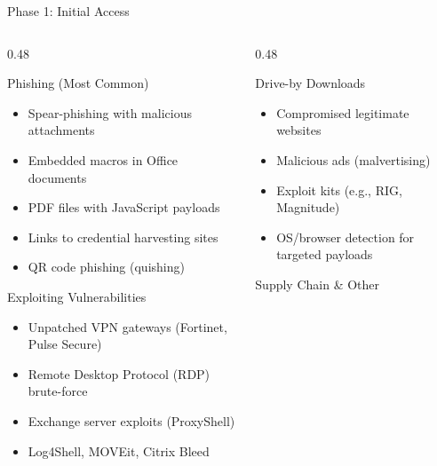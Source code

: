 \documentclass[aspectratio=169]{beamer}
\begin{document}
\begin{frame}{Phase 1: Initial Access}
  \vspace{0.5em}
  \begin{columns}[T]
    \begin{column}{0.48\textwidth}
      \begin{block}{Phishing (Most Common)}
        \footnotesize
        \begin{itemize}
          \item Spear-phishing with malicious attachments
          \item Embedded macros in Office documents
          \item PDF files with JavaScript payloads
          \item Links to credential harvesting sites
          \item QR code phishing (quishing)
        \end{itemize}
      \end{block}
      \vspace{0.3em}
      \begin{block}{Exploiting Vulnerabilities}
        \footnotesize
        \begin{itemize}
          \item Unpatched VPN gateways (Fortinet, Pulse Secure)
          \item Remote Desktop Protocol (RDP) brute-force
          \item Exchange server exploits (ProxyShell)
          \item Log4Shell, MOVEit, Citrix Bleed
        \end{itemize}
      \end{block}
    \end{column}
    \begin{column}{0.48\textwidth}
      \begin{block}{Drive-by Downloads}
        \footnotesize
        \begin{itemize}
          \item Compromised legitimate websites
          \item Malicious ads (malvertising)
          \item Exploit kits (e.g., RIG, Magnitude)
          \item OS/browser detection for targeted payloads
        \end{itemize}
      \end{block}
      \vspace{0.3em}
      \begin{block}{Supply Chain \& Other}

\end{block}
\end{column}
\end{columns}
\end{frame}
\end{document}

